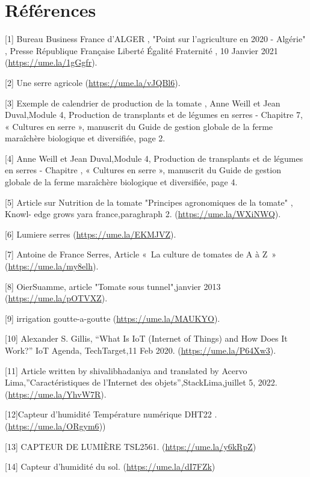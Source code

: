 \chapter{Références} 
\label{chap:Références} 


\noindent

[1] Bureau Business France d’ALGER , "Point sur l’agriculture en 2020 - Algérie" , Presse République 
\indent
Française Liberté Égalité Fraternité , 10 Janvier 2021 (\url{https://ume.la/1gGgfr}).
  
[2] Une serre agricole (\url{https://ume.la/vJQBl6}).

[3] Exemple de calendrier de production de la tomate , Anne Weill et Jean Duval,Module 4, 
 \indent
 Production de transplants et de légumes en serres - Chapitre 7, « Cultures en serre », manuscrit du \indent Guide de gestion globale de la ferme maraîchère biologique et
  diversifiée, page 2.
  
[4] Anne Weill et Jean Duval,Module 4, Production de transplants et de légumes en serres - Chapitre , « Cultures en serre », manuscrit du Guide de gestion globale de la ferme maraîchère biologique \indent et diversifiée, page 4.
 
[5] Article sur Nutrition de la tomate "Principes agronomiques de la tomate" , Knowl-
  edge grows \indent yara france,paraghraph 2. (\url{https://ume.la/WXiNWQ}).
 
[6] Lumiere serres (\url{https://ume.la/EKMJVZ}).

[7]  Antoine de France Serres, Article « La culture de tomates de A à Z » (\url{https://ume.la/my8elh}).

[8] OierSuamme, article "Tomate sous tunnel",janvier 2013 (\url{https://ume.la/pOTVXZ}).

[9] irrigation goutte-a-goutte (\url{https://ume.la/MAUKYO}).

[10] Alexander S. Gillis, “What Is IoT (Internet of Things) and How Does It Work?” IoT Agenda, \indent TechTarget,11 Feb 2020. (\url{https://ume.la/P64Xw3}).

[11] Article written by shivalibhadaniya and translated by Acervo Lima,”Caractéristiques de l’Internet \indent des objets”,StackLima,juillet 5, 2022.
(\url{https://ume.la/YhvW7R}).

[12]Capteur d'humidité Température numérique DHT22 .  (\url{https://ume.la/ORgym6}))

[13] CAPTEUR DE LUMIÈRE TSL2561. (\url{https://ume.la/y6kRpZ})

[14] Capteur d'humidité du sol. (\url{https://ume.la/dI7FZk})

